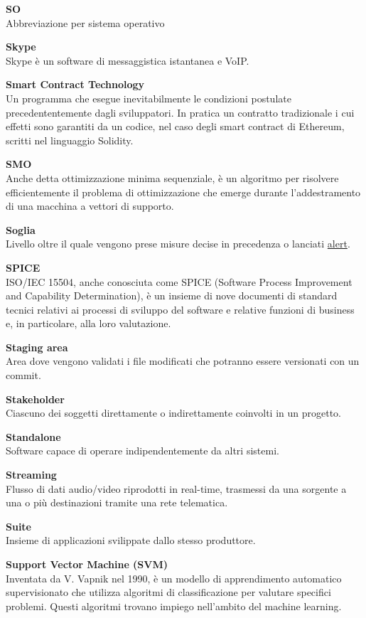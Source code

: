 \documentclass[a4paper, oneside, openany, dvipsnames, table, 12pt]{article}
\begin{document}
\textbf{SO} \\
Abbreviazione per sistema operativo

\textbf{Skype} \\
Skype è un software di messaggistica istantanea e VoIP\glo.

\textbf{Smart Contract Technology} \\
Un programma che esegue inevitabilmente le condizioni postulate precedententemente dagli sviluppatori. In pratica un contratto tradizionale i cui effetti sono garantiti da un codice, nel caso degli smart contract di Ethereum, scritti nel linguaggio Solidity.


\label{par:SMO}
\textbf{SMO} \\
Anche detta ottimizzazione minima sequenziale, è un algoritmo per risolvere efficientemente il problema di ottimizzazione che emerge durante l'addestramento di una macchina a vettori di supporto.

\textbf{Soglia} \\
Livello oltre il quale vengono prese misure decise in precedenza o lanciati \hyperref[par:alert]{alert\glo}.

\textbf{SPICE} \\
ISO/IEC 15504, anche conosciuta come SPICE (Software Process Improvement and Capability Determination), è un insieme di nove documenti di standard tecnici relativi ai processi di sviluppo del software e relative funzioni di business e, in particolare, alla loro valutazione.

\textbf{Staging area} \\
Area dove vengono validati i file modificati che potranno essere versionati con un commit\glo.

\textbf{Stakeholder} \\
Ciascuno dei soggetti direttamente o indirettamente coinvolti in un progetto.

\textbf{Standalone} \\
Software capace di operare indipendentemente da altri sistemi.

\textbf{Streaming} \\
Flusso di dati audio/video riprodotti in real-time, trasmessi da una sorgente a una o più destinazioni tramite una rete telematica.

\textbf{Suite} \\
Insieme di applicazioni svilippate dallo stesso produttore.

\textbf{Support Vector Machine (SVM)} \\
Inventata da V. Vapnik nel 1990, è un modello di apprendimento automatico supervisionato che utilizza algoritmi di classificazione per valutare specifici problemi. Questi algoritmi trovano impiego nell'ambito del machine learning.
\end{document}
